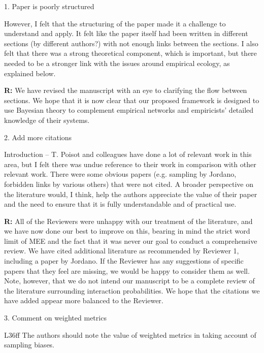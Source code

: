 \documentclass[12pt]{letter}
\newenvironment{refquote}{\bigskip \begin{it}}{\end{it}\smallskip}
\begin{document}
	1. Paper is poorly structured

		\begin{refquote}
		However, I felt that the structuring of the paper made it a challenge to understand and apply. It felt like the paper itself had been written in different sections (by different authors?) with not enough links between the sections. I also felt that there was a strong theoretical component, which is important, but there needed to be a stronger link with the issues around empirical ecology, as explained below.
		\end{refquote}


		\textbf{R:} We have revised the manuscript with an eye to clarifying the flow between sections. We hope that it is now clear that our proposed framework is designed to use Bayesian theory to complement empirical networks and empiricists' detailed knowledge of their systems. 


	2. Add more citations


		\begin{refquote}
		Introduction – T. Poisot and colleagues have done a lot of relevant work in this area, but I felt there was undue reference to their work in comparison with other relevant work. There were some obvious papers (e.g. sampling by Jordano, forbidden links by various others) that were not cited. A broader perspective on the literature would, I think, help the authors appreciate the value of their paper and the need to ensure that it is fully understandable and of practical use.
		\end{refquote}


		\textbf{R:} All of the Reviewers were unhappy with our treatment of the literature, and we have now done our best to improve on this, bearing in mind the strict word limit of MEE and the fact that it was never our goal to conduct a comprehensive review. We have cited additional literature as recommended by Reviewer 1, including a paper by Jordano. If the Reviewer has any suggestions of specific papers that they feel are missing, we would be happy to consider them as well. Note, however, that we do not intend our manuscript to be a complete review of the literature surrounding interaction probabilities. We hope that the citations we have added appear more balanced to the Reviewer.


	3. Comment on weighted metrics


		\begin{refquote}
		L36ff The authors should note the value of weighted metrics in taking account of sampling biases.
		\end{refquote}
\end{document}
